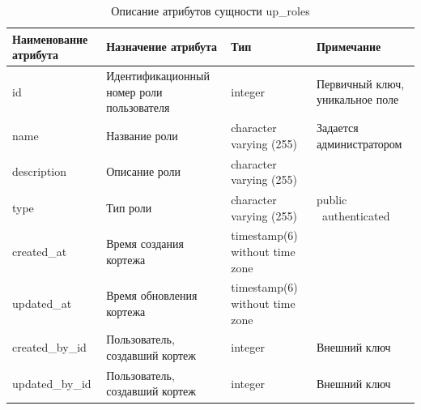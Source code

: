 \documentclass{mirea}
\begin{document}
	\begin{longtable}{ |p{}|p{}|p{}|p{}| } 
		\caption{Описание атрибутов сущности up\_roles}
		\endfirsthead
		\endhead
		\hline
		Наименование атрибута & Назначение атрибута & Тип & Примечание \\ \hline
		
		id & Идентификацион\-ный номер роли пользователя & integer & Первичный ключ, уникальное поле \\ \hline
		
		name & Название роли & character varying (255) & Задается администратором \\ \hline
		
		description & Описание роли  & character varying (255) & \\ \hline
		
		type & Тип роли  & character varying (255) & public \ authenticated \\ \hline
		
		created\_at & Время создания кортежа & timestamp(6) without time zone & \\ \hline
		
		updated\_at & Время обновления кортежа & timestamp(6) without time zone & \\ \hline
		
		created\_by\_id & Пользователь, создавший кортеж & integer & Внешний ключ \\ \hline
		
		updated\_by\_id & Пользователь, создавший кортеж & integer & Внешний ключ \\ \hline
		
	\end{longtable}
\end{document}
